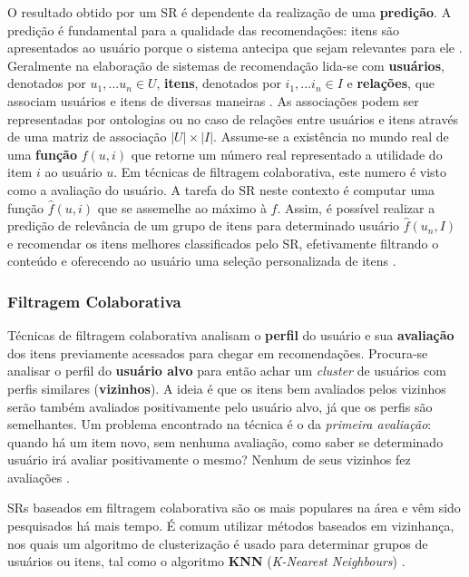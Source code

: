 \documentclass[12pt]{article}
\begin{document}
O resultado obtido por um SR é dependente da realização de uma \textbf{predição}. A predição é fundamental para a qualidade 
das recomendações: itens são apresentados ao usuário porque o sistema antecipa que sejam relevantes para ele 
\cite{ricci2011introduction}. Geralmente na elaboração de sistemas de recomendação lida-se com \textbf{usuários}, denotados por 
$ u_1, ... u_n \in U $, \textbf{itens}, denotados por $ i_1, ... i_n \in I$  e \textbf{relações}, que associam usuários e 
itens de diversas maneiras \cite{ekstrand2019recommender}. As associações podem ser representadas por ontologias 
\cite{primo2006tecnicas} ou no caso de relações entre usuários e itens através de uma matriz de associação $ |U| \times |I| $. 
Assume-se a existência no mundo real de uma \textbf{função} $ f (u, i) $ que retorne um número real representado a utilidade do 
item $i$ ao usuário $u$. Em técnicas de filtragem colaborativa, este numero é visto como a avaliação do usuário. A tarefa do SR 
neste contexto é computar uma função $\hat{f}(u, i)$ que se assemelhe ao máximo à $f$. 
Assim, é possível realizar a predição de relevância de um grupo de itens para determinado usuário $\hat{f}(u_n, I)$ e recomendar 
os itens melhores classificados pelo SR, efetivamente filtrando o conteúdo e oferecendo ao usuário uma seleção personalizada de 
itens \cite{ricci2011introduction}.

\subsubsection{Filtragem Colaborativa}

Técnicas de filtragem colaborativa analisam o \textbf{perfil} do usuário e sua \textbf{avaliação} dos itens previamente 
acessados para chegar em recomendações. Procura-se analisar o perfil do \textbf{usuário alvo} para então achar um \textit{cluster} 
de usuários com perfis similares (\textbf{vizinhos}). A ideia é que os itens bem avaliados pelos vizinhos serão também 
avaliados positivamente pelo usuário alvo, já que os perfis são semelhantes. Um problema encontrado na técnica é o da \textit{primeira avaliação}: quando há um item novo, sem nenhuma avaliação, como saber se determinado usuário irá avaliar 
positivamente o mesmo? Nenhum de seus vizinhos fez avaliações \cite{ricci2011introduction}.

SRs baseados em filtragem colaborativa são os mais populares na área e vêm sido pesquisados há mais tempo. \cite{ricci2011introduction} 
É comum utilizar métodos baseados em vizinhança, nos quais um algoritmo de clusterização é usado para determinar grupos 
de usuários ou itens, tal como o algoritmo \textbf{KNN} (\textit{K-Nearest Neighbours}) \cite{da2018desenvolvimento}.
\end{document}
